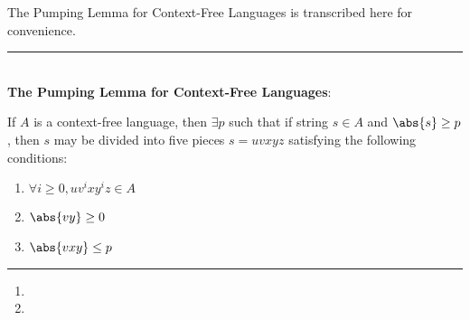 The Pumping Lemma for Context-Free Languages is transcribed here for convenience.
\rule{\textwidth}{1pt}\\[1em]
\textbf{The Pumping Lemma for Context-Free Languages}: \par
If $A$ is a context-free language, then $\exists p$ such that if string $s \in A$ and $\abs{s} \geq p$, then $s$ may be divided into five pieces $s = uvxyz$ satisfying the following conditions:
\begin{enumerate}[label=\arabic*.]
	\item $\forall i \geq 0, uv^ixy^iz \in A$
	\item $\abs{vy} \geq 0$
	\item $\abs{vxy} \leq p$
\end{enumerate}
\rule{\textwidth}{1pt}

\begin{enumerate}
	\item 
	\addtocounter{enumi}{2}
	\item 
\end{enumerate}